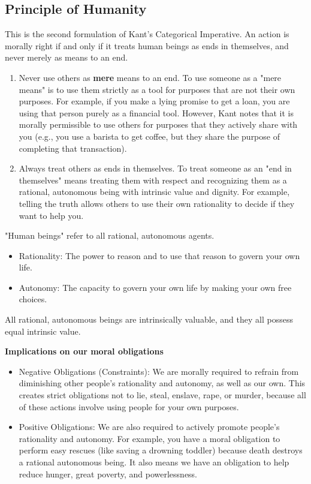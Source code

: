 \documentclass[12pt]{article}
\begin{document}
\subsection{Principle of Humanity}
This is the second formulation of Kant's Categorical Imperative.
An action is morally right if and only if it treats human beings as ends in themselves, and never merely as means to an end.
\begin{enumerate}
    \item Never use others as \textbf{mere} means to an end.
    To use someone as a "mere means" is to use them strictly as a tool for purposes that are not their own purposes.
    For example, if you make a lying promise to get a loan, you are using that person purely as a financial tool.
    However, Kant notes that it is morally permissible to use others for purposes that they actively share with you  (e.g., you use a barista to get coffee, but they share the purpose of completing that transaction).
    \item Always treat others as ends in themselves.
    To treat someone as an "end in themselves" means treating them with respect and recognizing them as a rational, autonomous being with intrinsic value and dignity.
    For example, telling the truth allows others to use their own rationality to decide if they want to help you.
\end{enumerate}
"Human beings" refer to all rational, autonomous agents.
\begin{itemize}
    \item Rationality: The power to reason and to use that reason to govern your own life.
    \item Autonomy: The capacity to govern your own life by making your own free choices.
\end{itemize}
All rational, autonomous beings are intrinsically valuable, and they all possess equal intrinsic value.

\noindent\textbf{Implications on our moral obligations}
\begin{itemize}
    \item Negative Obligations (Constraints):
    We are morally required to refrain from diminishing other people's rationality and autonomy, as well as our own. 
    This creates strict obligations not to lie, steal, enslave, rape, or murder, because all of these actions involve using people for your own purposes.
    \item Positive Obligations:
    We are also required to actively promote people's rationality and autonomy. 
    For example, you have a moral obligation to perform easy rescues (like saving a drowning toddler) because death destroys a rational autonomous being. 
    It also means we have an obligation to help reduce hunger, great poverty, and powerlessness.
\end{itemize}
\end{document}
